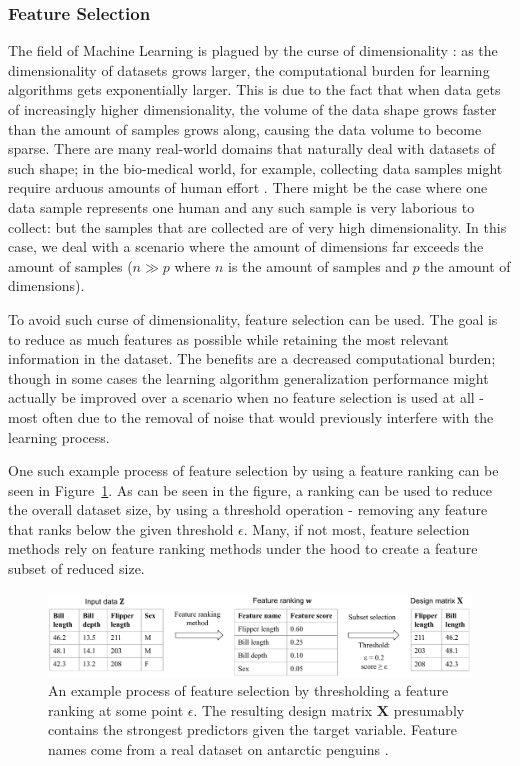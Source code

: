 \documentclass{article}
\begin{document}
\subsubsection{Feature Selection}
The field of Machine Learning is plagued by the curse of dimensionality \citep{koppen_curse_2009}: as the dimensionality of datasets grows larger, the computational burden for learning algorithms gets exponentially larger. This is due to the fact that when data gets of increasingly higher dimensionality, the volume of the data shape grows faster than the amount of samples grows along, causing the data volume to become sparse.
There are many real-world domains that naturally deal with datasets of such shape; in the bio-medical world, for example, collecting data samples might require arduous amounts of human effort \citep{hu_feature_2018}. There might be the case where one data sample represents one human and any such sample is very laborious to collect: but the samples that are collected are of very high dimensionality. In this case, we deal with a scenario where the amount of dimensions far exceeds the amount of samples ($n \gg p$ where $n$ is the amount of samples and $p$ the amount of dimensions).

To avoid such curse of dimensionality, feature selection can be used. The goal is to reduce as much features as possible while retaining the most relevant information in the dataset. The benefits are a decreased computational burden; though in some cases the learning algorithm generalization performance might actually be improved over a scenario when no feature selection is used at all - most often due to the removal of noise that would previously interfere with the learning process.

One such example process of feature selection by using a feature ranking can be seen in Figure~\ref{fig:schematic-feature-selection}. As can be seen in the figure, a ranking can be used to reduce the overall dataset size, by using a threshold operation - removing any feature that ranks below the given threshold $\epsilon$. Many, if not most, feature selection methods rely on feature ranking methods under the hood to create a feature subset of reduced size.

\begin{figure}[h]
    \centering
    \includegraphics[width=\linewidth]{report/images/schematic-feature-selection.pdf}
    \caption{An example process of feature selection by thresholding a feature ranking at some point $\epsilon$. The resulting design matrix $\mathbf{X}$ presumably contains the strongest predictors given the target variable. Feature names come from a real dataset on antarctic penguins \citep{horst_palmerpenguins_2020}.}
    \label{fig:schematic-feature-selection}
\end{figure}
\end{document}
